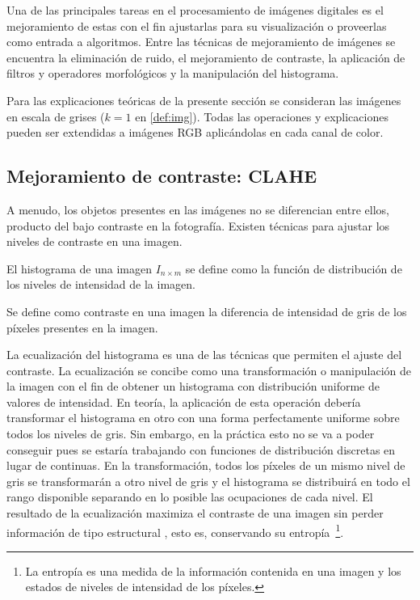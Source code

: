 Una de las principales tareas en el procesamiento de imágenes digitales es el mejoramiento de estas con el fin ajustarlas para su visualización o proveerlas como entrada a algoritmos. Entre las técnicas de mejoramiento de imágenes se encuentra la eliminación de ruido, el mejoramiento de contraste, la aplicación de filtros y operadores morfológicos y la manipulación del histograma.

Para las explicaciones teóricas de la presente sección se consideran las imágenes en escala de grises ($k=1$ en \ref{def:img}). Todas las operaciones y explicaciones pueden ser extendidas a imágenes RGB aplicándolas en cada canal de color.

\subsection{Mejoramiento de contraste: CLAHE}

A menudo, los objetos presentes en las imágenes no se diferencian entre ellos, producto del bajo contraste en la fotografía. Existen técnicas para ajustar los niveles de contraste en una imagen.

\begin{definition}
	El histograma de una imagen $I_{n \times m}$ se define como la función de distribución de los niveles de intensidad de la imagen.
\end{definition}

\begin{definition}
	Se define como contraste en una imagen la diferencia de intensidad de gris de los píxeles presentes en la imagen.
\end{definition}

La ecualización del histograma es una de las técnicas que permiten el ajuste del contraste. La ecualización se concibe como una transformación o manipulación de la imagen con el fin de obtener un histograma con distribución uniforme de valores de intensidad. En teoría, la aplicación de esta operación debería transformar el histograma en otro con una forma perfectamente uniforme sobre todos los niveles de gris. Sin embargo, en la práctica esto no se va a poder conseguir pues se estaría trabajando con funciones de distribución discretas en lugar de continuas. En la transformación, todos los píxeles de un mismo nivel de gris se transformarán a otro nivel de gris y el histograma se distribuirá en todo el rango disponible separando en lo posible las ocupaciones de cada nivel. El resultado de la ecualización maximiza el contraste de una imagen sin perder información de tipo estructural \cite{solomon2011fundamentals}, esto es, conservando su entropía~\footnote{La entropía es una medida de la información contenida en una imagen y los estados de niveles de intensidad de los píxeles.}.

